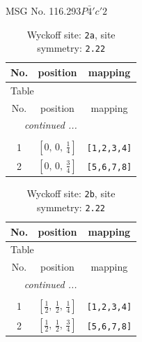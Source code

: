 \documentclass[fleqn,8pt]{jsarticle}
\begin{document}
\setcounter{MaxMatrixCols}{32}

\renewcommand{\tablename}{Table~}
\renewcommand{\figurename}{Figure~}
\begin{center}
\LARGE
MSG No. 116.293\quad$P\bar{4}'c'2$
\end{center}
\renewcommand{\arraystretch}{1.2}
\begin{longtable}{ccc}
\caption{Wyckoff site: {\tt 2a}, site symmetry: {\tt 2.22}}
 \\
 \hline \hline
No. & position & mapping \\ \hline \endfirsthead

\multicolumn{2}{l}{\tablename\ \thetable{}} \\
 \hline \hline
No. & position & mapping \\ \hline \endhead

 \hline \hline
\multicolumn{2}{r}{\footnotesize\it continued ...} \\ \endfoot

 \hline \hline
\multicolumn{2}{r}{} \\ \endlastfoot

1 & $\left[ 0,\, 0,\, \frac{1}{4} \right]$ & {\tt [1,2,3,4]} \\ \hline
2 & $\left[ 0,\, 0,\, \frac{3}{4} \right]$ & {\tt [5,6,7,8]} \\
\end{longtable}
\renewcommand{\arraystretch}{1.2}
\begin{longtable}{ccc}
\caption{Wyckoff site: {\tt 2b}, site symmetry: {\tt 2.22}}
 \\
 \hline \hline
No. & position & mapping \\ \hline \endfirsthead

\multicolumn{2}{l}{\tablename\ \thetable{}} \\
 \hline \hline
No. & position & mapping \\ \hline \endhead

 \hline \hline
\multicolumn{2}{r}{\footnotesize\it continued ...} \\ \endfoot

 \hline \hline
\multicolumn{2}{r}{} \\ \endlastfoot

1 & $\left[ \frac{1}{2},\, \frac{1}{2},\, \frac{1}{4} \right]$ & {\tt [1,2,3,4]} \\ \hline
2 & $\left[ \frac{1}{2},\, \frac{1}{2},\, \frac{3}{4} \right]$ & {\tt [5,6,7,8]} \\
\end{longtable}
\end{document}

